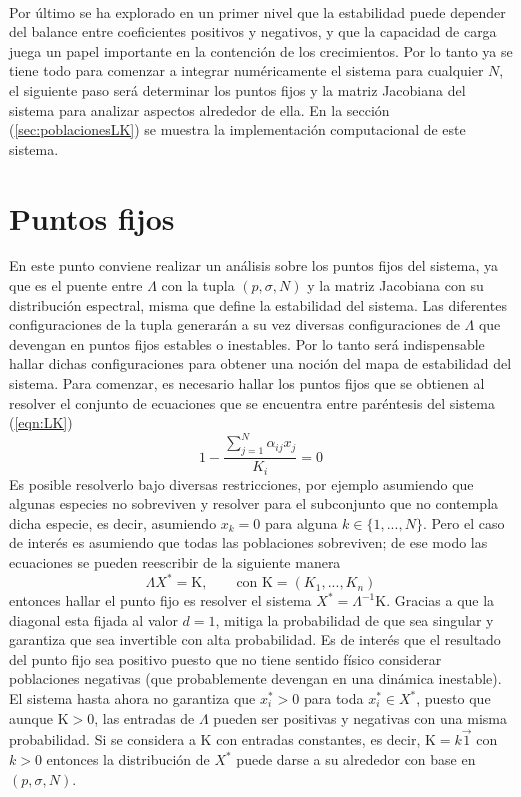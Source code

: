 \\
Por último se ha explorado en un primer nivel que la estabilidad puede depender del balance entre coeficientes positivos y negativos, y que la capacidad de carga juega un papel importante en la contención de los crecimientos. Por lo tanto ya se tiene todo para comenzar a integrar numéricamente el sistema para cualquier $N$, el siguiente paso será determinar los puntos fijos y la matriz Jacobiana del sistema para analizar aspectos alrededor de ella. En la sección (\ref{sec:poblacionesLK}) se muestra la implementación computacional de este sistema.
\newpage
\section{Puntos fijos}\label{subsec:PuntosFijos}

En este punto conviene realizar un análisis sobre los puntos fijos del sistema, ya que  es el puente entre $\Lambda$ con la tupla $(p,\sigma,N)$ y la matriz Jacobiana con su distribución espectral, misma que define la estabilidad del sistema. Las diferentes configuraciones de la tupla generarán a su vez diversas configuraciones de $\Lambda$ que devengan en puntos fijos estables o inestables. Por lo tanto será indispensable hallar dichas configuraciones para obtener una noción del mapa de estabilidad del sistema. Para comenzar, es necesario hallar los puntos fijos que se obtienen al resolver el conjunto de ecuaciones que se encuentra entre paréntesis del sistema (\ref{eqn:LK})
$$1-\frac{\sum_{j=1}^N\alpha_{ij}x_j}{K_i}=0$$
Es posible resolverlo bajo diversas restricciones, por ejemplo asumiendo que algunas especies no sobreviven y resolver para el subconjunto que no contempla dicha especie, es decir, asumiendo $x_k=0$ para alguna $k\in\{1,...,N\}$. Pero el caso de interés es asumiendo que todas las poblaciones sobreviven; de ese modo las ecuaciones se pueden reescribir de la siguiente manera
$$\Lambda X^*=\mathrm{K},\qquad\text{con }\mathrm{K}=(K_1,...,K_n)$$
entonces hallar el punto fijo es resolver el sistema $X^*=\Lambda^{-1}\mathrm{K}$. Gracias a que la diagonal esta fijada al valor $d=1$, mitiga la probabilidad de que sea singular y garantiza que sea invertible con alta probabilidad. Es de interés que el resultado del punto fijo sea positivo puesto que no tiene sentido físico considerar poblaciones negativas (que probablemente devengan en una dinámica inestable). El sistema hasta ahora no garantiza que $x_i^*>0$ para toda $x_i^*\in X^*$, puesto que aunque $\mathrm{K}>0$, las entradas de $\Lambda$ pueden ser positivas y negativas con una misma probabilidad. Si se considera a $\mathrm{K}$ con entradas constantes, es decir, $\mathrm{K}=k\vec{1}$ con $k>0$ entonces la distribución de $X^*$ puede darse a su alrededor con base en $(p,\sigma,N)$. \\
